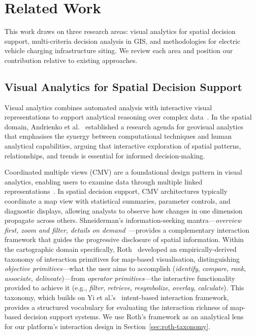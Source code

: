 
\section{Related Work}
\label{sec:related-work}

This work draws on three research areas: visual analytics for spatial decision support, multi-criteria decision analysis in GIS, and methodologies for electric vehicle charging infrastructure siting. We review each area and position our contribution relative to existing approaches.

\subsection{Visual Analytics for Spatial Decision Support}
\label{sec:rw-va}

Visual analytics combines automated analysis with interactive visual representations to support analytical reasoning over complex data~\cite{keim2008visual}. In the spatial domain, Andrienko et al.~\cite{andrienko2007geovisual} established a research agenda for geovisual analytics that emphasises the synergy between computational techniques and human analytical capabilities, arguing that interactive exploration of spatial patterns, relationships, and trends is essential for informed decision-making.

Coordinated multiple views (CMV) are a foundational design pattern in visual analytics, enabling users to examine data through multiple linked representations~\cite{roberts2007coordinated}. In spatial decision support, CMV architectures typically coordinate a map view with statistical summaries, parameter controls, and diagnostic displays, allowing analysts to observe how changes in one dimension propagate across others. Shneiderman's information-seeking mantra---\emph{overview first, zoom and filter, details on demand}~\cite{shneiderman1996eyes}---provides a complementary interaction framework that guides the progressive disclosure of spatial information. Within the cartographic domain specifically, Roth~\cite{roth2013taxonomy} developed an empirically-derived taxonomy of interaction primitives for map-based visualisation, distinguishing \emph{objective primitives}---what the user aims to accomplish (\emph{identify}, \emph{compare}, \emph{rank}, \emph{associate}, \emph{delineate})---from \emph{operator primitives}---the interactive functionality provided to achieve it (e.g., \emph{filter}, \emph{retrieve}, \emph{resymbolize}, \emph{overlay}, \emph{calculate}). This taxonomy, which builds on Yi et al.'s~\cite{yi2007interaction} intent-based interaction framework, provides a structured vocabulary for evaluating the interaction richness of map-based decision support systems. We use Roth's framework as an analytical lens for our platform's interaction design in Section~\ref{sec:roth-taxonomy}.

